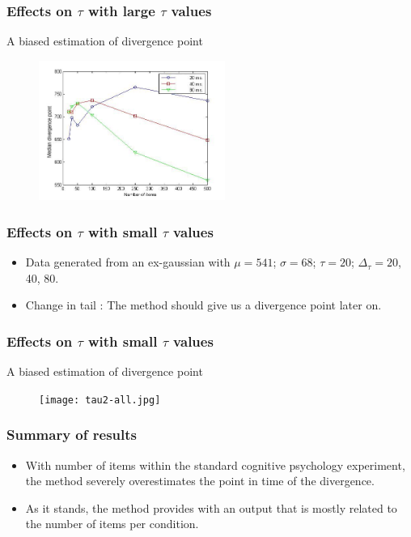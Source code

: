 \documentclass{beamer}
\begin{document}
{{\begin{itemize}
			\end{itemize}
	}	
	\frame
	{
			
		\frametitle{Effects on $\tau$ with large $\tau$ values}
		A biased estimation of divergence point
		\begin{figure}[htbp] %
    			\centering
    			\includegraphics[width=2.4in]{tau-all.jpg} 
    			\label{fig:dvff}
 		\end{figure}		
	
	}
	
	\frame
	{
		\frametitle{Effects on $\tau$ with small $\tau$ values}
			\begin{itemize}
				\item Data generated from an ex-gaussian with  $\mu= 541$; $\sigma = 68$; $\tau = 20$; $\Delta_\tau = 20$, 40, 80.
				\item Change in tail : The method should give us a divergence point later on.
			\end{itemize}
	}	
	\frame
	{
			
		\frametitle{Effects on $\tau$ with small $\tau$ values}
		A biased estimation of divergence point
		\begin{figure}[htbp] %
    			\centering
    			\texttt{[image: tau2-all.jpg]} 
    			\label{fig:dvff}
 		\end{figure}		
	
	}
	
	
	
	
	
	
	\frame
	{
		\frametitle{Summary of results}
			\begin{itemize}
				\item With number of items within the standard cognitive psychology experiment, the method severely overestimates the point in time of the divergence.
				\item As it stands, the method provides with an output  that is mostly related to the number of items per condition.  
			\end{itemize}
		

	}
}	
\end{document}
